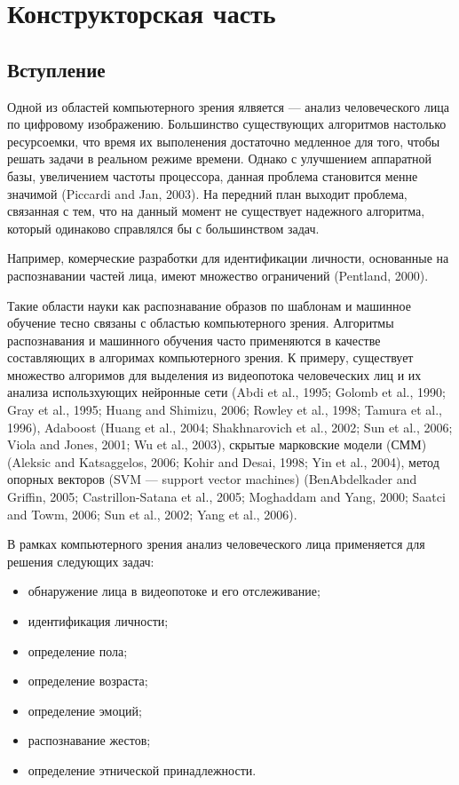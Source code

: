 \chapter{Конструкторская часть}
\label{cha:design}


\section{Вступление}
Одной из областей компьютерного зрения ялвяется --- анализ человеческого лица по цифровому изображению.
Большинство существующих алгоритмов настолько ресурсоемки, что время их выполенения достаточно медленное для того, чтобы решать задачи в реальном режиме времени.
Однако с улучшением аппаратной базы, увеличением частоты процессора, данная проблема становится менне значимой (Piccardi and Jan, 2003).
На передний план выходит проблема, связанная с тем, что на данный момент не существует надежного алгоритма, который одинаково справлялся бы с большинством задач.

Например, комерческие разработки для идентификации личности, основанные на распознавании частей лица, имеют множество ограничений (Pentland, 2000). 

Такие области науки как распознавание образов по шаблонам и машинное обучение тесно связаны с областью компьютерного зрения. Алгоритмы распознавания и машинного обучения часто применяются в качестве составляющих в алгоримах компьютерного зрения. К примеру, существует множество алгоримов для выделения из видеопотока человеческих лиц и их анализа использхующих нейронные сети (Abdi et al., 1995; Golomb et al., 1990; Gray et al., 1995; Huang and Shimizu, 2006; Rowley et al., 1998; Tamura et al., 1996), Adaboost (Huang et al., 2004; Shakhnarovich et al., 2002; Sun et al., 2006; Viola and Jones, 2001; Wu et al., 2003), скрытые марковские модели (СММ) (Aleksic and Katsaggelos, 2006; Kohir and Desai, 1998; Yin et al., 2004), метод опорных векторов (SVM — support vector machines) (BenAbdelkader and Griffin, 2005; Castrillon-Satana et al., 2005; Moghaddam and Yang, 2000; Saatci and Towm, 2006; Sun et al., 2002; Yang et al., 2006).

В рамках компьютерного зрения анализ человеческого лица применяется для решения следующих задач:


\begin{itemize}
	\item обнаружение лица в видеопотоке и его отслеживание;
	\item идентификация личности;
	\item определение пола;
	\item определение возраста;
	\item определение эмоций;
	\item распознавание жестов;
	\item определение этнической принадлежности.
\end{itemize}

